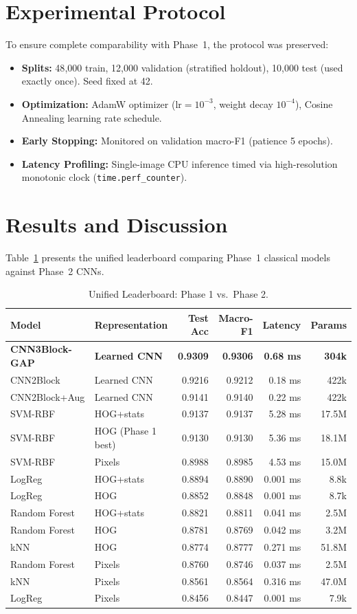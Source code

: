 \documentclass[conference]{IEEEtran}
\begin{document}
\section{Experimental Protocol}
To ensure complete comparability with Phase~1, the protocol was preserved:
\begin{itemize}
\item \textbf{Splits:} 48{,}000 train, 12{,}000 validation (stratified holdout), 10{,}000 test (used exactly once). Seed fixed at 42.
\item \textbf{Optimization:} AdamW optimizer ($\mathrm{lr}=10^{-3}$, weight decay $10^{-4}$), Cosine Annealing learning rate schedule.
\item \textbf{Early Stopping:} Monitored on validation macro-F1 (patience 5 epochs).
\item \textbf{Latency Profiling:} Single-image CPU inference timed via high-resolution monotonic clock (\texttt{time.perf\_counter}).
\end{itemize}

\section{Results and Discussion}
Table~\ref{tab:unified} presents the unified leaderboard comparing Phase~1 classical models against Phase~2 CNNs.

\begin{table}[t]\centering\caption{Unified Leaderboard: Phase 1 vs.\ Phase 2.}\label{tab:unified}
\begin{tabular}{@{}llrrrr@{}}\toprule
Model & Representation & Test Acc & Macro-F1 & Latency & Params\\\midrule
\textbf{CNN3Block-GAP} & \textbf{Learned CNN} & \textbf{0.9309} & \textbf{0.9306} & \textbf{0.68 ms} & \textbf{304k}\\
CNN2Block & Learned CNN & 0.9216 & 0.9212 & 0.18 ms & 422k\\
CNN2Block+Aug & Learned CNN & 0.9141 & 0.9140 & 0.22 ms & 422k\\\midrule
SVM-RBF & HOG+stats & 0.9137 & 0.9137 & 5.28 ms & 17.5M\\
SVM-RBF & HOG (Phase 1 best) & 0.9130 & 0.9130 & 5.36 ms & 18.1M\\
SVM-RBF & Pixels & 0.8988 & 0.8985 & 4.53 ms & 15.0M\\
LogReg & HOG+stats & 0.8894 & 0.8890 & 0.001 ms & 8.8k\\
LogReg & HOG & 0.8852 & 0.8848 & 0.001 ms & 8.7k\\
Random Forest & HOG+stats & 0.8821 & 0.8811 & 0.041 ms & 2.5M\\
Random Forest & HOG & 0.8781 & 0.8769 & 0.042 ms & 3.2M\\
kNN & HOG & 0.8774 & 0.8777 & 0.271 ms & 51.8M\\
Random Forest & Pixels & 0.8760 & 0.8746 & 0.037 ms & 2.5M\\
kNN & Pixels & 0.8561 & 0.8564 & 0.316 ms & 47.0M\\
LogReg & Pixels & 0.8456 & 0.8447 & 0.001 ms & 7.9k\\\bottomrule
\end{tabular}\end{table}
\end{document}
